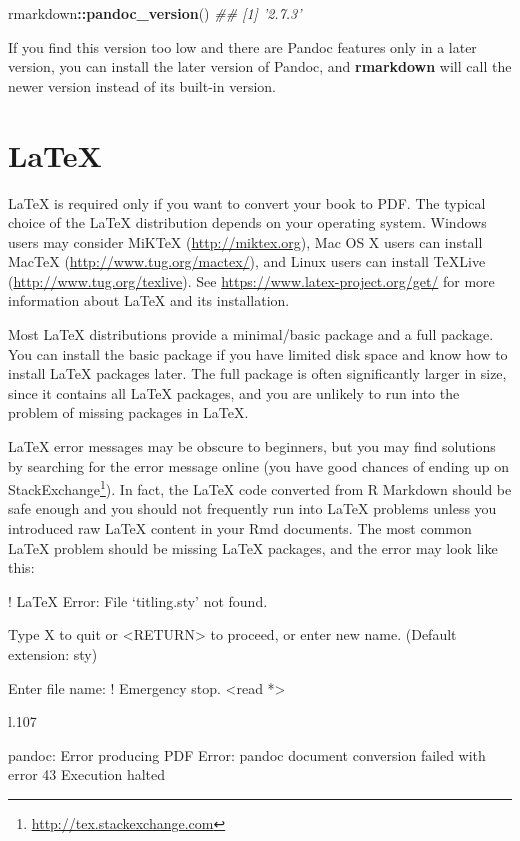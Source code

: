 \documentclass[
  12pt,
]{krantz}
\makeatletter
\newenvironment{Shaded}{\begin{snugshade}}{\end{snugshade}}
\newcommand{\CommentTok}[1]{\textcolor[rgb]{0.56,0.35,0.01}{\textit{#1}}}
\newcommand{\KeywordTok}[1]{\textcolor[rgb]{0.13,0.29,0.53}{\textbf{#1}}}
\newcommand{\NormalTok}[1]{#1}
\newcommand{\OperatorTok}[1]{\textcolor[rgb]{0.81,0.36,0.00}{\textbf{#1}}}
\renewcommand{\href}[2]{#2\footnote{\url{#1}}}
\newenvironment{kframe}{%
\medskip{}
\setlength{\fboxsep}{.8em}
 \def\at@end@of@kframe{}%
 \ifinner\ifhmode%
  \def\at@end@of@kframe{\end{minipage}}%
  \begin{minipage}{\columnwidth}%
 \fi\fi%
 \def\FrameCommand##1{\hskip\@totalleftmargin \hskip-\fboxsep
 \colorbox{shadecolor}{##1}\hskip-\fboxsep
     \hskip-\linewidth \hskip-\@totalleftmargin \hskip\columnwidth}%
 \MakeFramed {\advance\hsize-\width
   \@totalleftmargin\z@ \linewidth\hsize
   \@setminipage}}%
 {\par\unskip\endMakeFramed%
 \at@end@of@kframe}
\renewenvironment{Shaded}{\begin{kframe}}{\end{kframe}}
\theoremstyle{definition}
\theoremstyle{definition}
\theoremstyle{definition}
\theoremstyle{remark}
\makeatother
\begin{document}
\begin{Shaded}
\begin{Highlighting}[]
\NormalTok{rmarkdown}\OperatorTok{::}\KeywordTok{pandoc_version}\NormalTok{()}
\CommentTok{## [1] '2.7.3'}
\end{Highlighting}
\end{Shaded}

If you find this version too low and there are Pandoc features only in a later version, you can install the later version of Pandoc, and \textbf{rmarkdown} will call the newer version instead of its built-in version.

\hypertarget{latex}{%
\section{LaTeX}\label{latex}}

LaTeX is required only if you want to convert your book to PDF. The typical choice of the LaTeX distribution depends on your operating system. Windows users may consider MiKTeX (\url{http://miktex.org}), Mac OS X users can install MacTeX (\url{http://www.tug.org/mactex/}), and Linux users can install TeXLive (\url{http://www.tug.org/texlive}). See \url{https://www.latex-project.org/get/} for more information about LaTeX and its installation.

Most LaTeX distributions provide a minimal/basic package and a full package. You can install the basic package if you have limited disk space and know how to install LaTeX packages later. The full package is often significantly larger in size, since it contains all LaTeX packages, and you are unlikely to run into the problem of missing packages in LaTeX.

LaTeX error messages may be obscure to beginners, but you may find solutions by searching for the error message online (you have good chances of ending up on \href{http://tex.stackexchange.com}{StackExchange}). In fact, the LaTeX code converted from R Markdown should be safe enough and you should not frequently run into LaTeX problems unless you introduced raw LaTeX content in your Rmd documents. The most common LaTeX problem should be missing LaTeX packages, and the error may look like this:

\begin{Shaded}
\begin{Highlighting}[]
\NormalTok{! LaTeX Error: File `titling.sty' not found.}

\NormalTok{Type X to quit or <RETURN> to proceed,}
\NormalTok{or enter new name. (Default extension: sty)}

\NormalTok{Enter file name: }
\NormalTok{! Emergency stop.}
\NormalTok{<read *> }
         
\NormalTok{l.107 ^^M}

\NormalTok{pandoc: Error producing PDF}
\NormalTok{Error: pandoc document conversion failed with error 43}
\NormalTok{Execution halted}
\end{Highlighting}
\end{Shaded}
\end{document}
